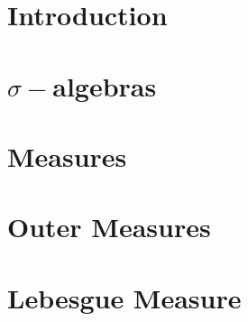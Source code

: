 \section{Introduction}
\section{$\sigma-$algebras}
\section{Measures}
\section{Outer Measures}
\section{Lebesgue Measure}

